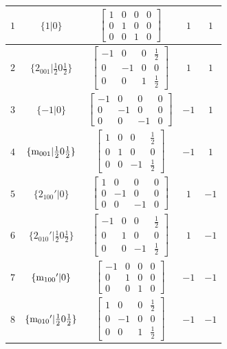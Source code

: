 \documentclass[fleqn,8pt]{jsarticle}
\begin{document}
\begin{longtable}{ccccc}
$ 1 $ & $ \{1|0\} $ & $ \begin{bmatrix} 1 & 0 & 0 & 0 \\ 0 & 1 & 0 & 0 \\ 0 & 0 & 1 & 0 \end{bmatrix} $ & $ 1 $ & $ 1 $ \\ \hline
$ 2 $ & $ \{2{}_{001}|\frac{1}{2} 0 \frac{1}{2}\} $ & $ \begin{bmatrix} -1 & 0 & 0 & \frac{1}{2} \\ 0 & -1 & 0 & 0 \\ 0 & 0 & 1 & \frac{1}{2} \end{bmatrix} $ & $ 1 $ & $ 1 $ \\ \hline
$ 3 $ & $ \{-1|0\} $ & $ \begin{bmatrix} -1 & 0 & 0 & 0 \\ 0 & -1 & 0 & 0 \\ 0 & 0 & -1 & 0 \end{bmatrix} $ & $ -1 $ & $ 1 $ \\ \hline
$ 4 $ & $ \{{\rm m}_{001}|\frac{1}{2} 0 \frac{1}{2}\} $ & $ \begin{bmatrix} 1 & 0 & 0 & \frac{1}{2} \\ 0 & 1 & 0 & 0 \\ 0 & 0 & -1 & \frac{1}{2} \end{bmatrix} $ & $ -1 $ & $ 1 $ \\ \hline
$ 5 $ & $ \{2{}_{100}{}'|0\} $ & $ \begin{bmatrix} 1 & 0 & 0 & 0 \\ 0 & -1 & 0 & 0 \\ 0 & 0 & -1 & 0 \end{bmatrix} $ & $ 1 $ & $ -1 $ \\ \hline
$ 6 $ & $ \{2{}_{010}{}'|\frac{1}{2} 0 \frac{1}{2}\} $ & $ \begin{bmatrix} -1 & 0 & 0 & \frac{1}{2} \\ 0 & 1 & 0 & 0 \\ 0 & 0 & -1 & \frac{1}{2} \end{bmatrix} $ & $ 1 $ & $ -1 $ \\ \hline
$ 7 $ & $ \{{\rm m}_{100}{}'|0\} $ & $ \begin{bmatrix} -1 & 0 & 0 & 0 \\ 0 & 1 & 0 & 0 \\ 0 & 0 & 1 & 0 \end{bmatrix} $ & $ -1 $ & $ -1 $ \\ \hline
$ 8 $ & $ \{{\rm m}_{010}{}'|\frac{1}{2} 0 \frac{1}{2}\} $ & $ \begin{bmatrix} 1 & 0 & 0 & \frac{1}{2} \\ 0 & -1 & 0 & 0 \\ 0 & 0 & 1 & \frac{1}{2} \end{bmatrix} $ & $ -1 $ & $ -1 $ \\
\end{longtable}
\end{document}
